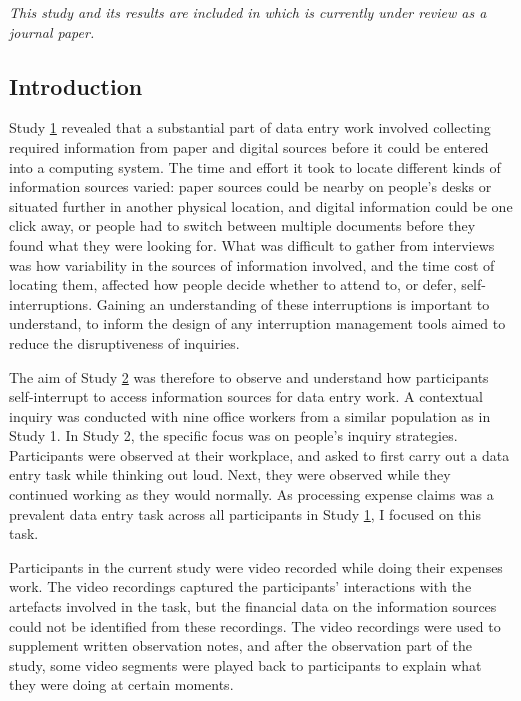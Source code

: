 \textit{This study and its results are included in \citet{Borghouts2018} which is currently under review as a journal paper.}

\subsection{Introduction}
Study \hyperref[st:Study1]{1}  revealed that a substantial part of data entry work involved collecting required information from paper and digital sources before it could be entered into a computing system. The time and effort it took to locate different kinds of information sources varied: paper sources could be nearby on people's desks or situated further in another physical location, and digital information could be one click away, or people had to switch between multiple documents before they found what they were looking for. What was difficult to gather from interviews was how variability in the sources of information involved, and the time cost of locating them, affected how people decide whether to attend to, or defer, self-interruptions. Gaining an understanding of these interruptions is important to understand,  to inform the design of any interruption management tools aimed to reduce the disruptiveness of inquiries.


The aim of Study \hyperref[st:Study2]{2} was therefore to observe and understand how participants self-interrupt to access information sources for data entry work. A contextual inquiry was conducted with nine office workers from a similar population as in Study 1. In Study 2, the specific focus was on people's inquiry strategies. Participants were observed at their workplace, and asked to first carry out a data entry task while thinking out loud. Next, they were observed while they continued working as they would normally. As processing expense claims was a prevalent data entry task across all participants in Study \hyperref[st:Study1]{1}, I focused on this task.

Participants in the current study were video recorded while doing their expenses work. The video recordings captured the participants' interactions with the artefacts involved in the task, but the financial data on the information sources could not be identified from these recordings. The video recordings were used to supplement written observation notes, and after the observation part of the study, some video segments were played back to participants to explain what they were doing at certain moments.

